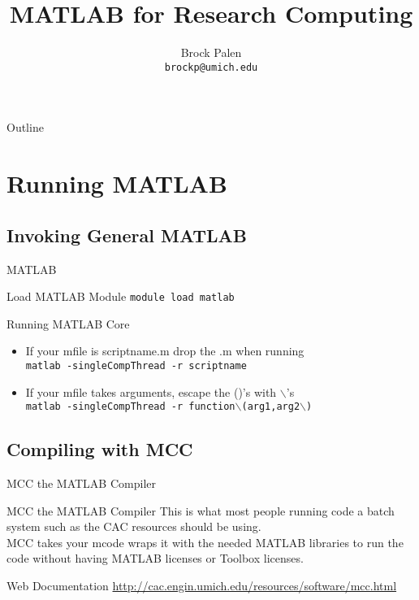 \documentclass[handout]{beamer}
\title[MATLAB for Research Computing] {MATLAB for Research Computing}
\author{Brock Palen\\ \texttt{brockp@umich.edu}}
\begin{document}
  \begin{frame}
    \titlepage
  \end{frame}

  \begin{frame}{Outline}
    \tableofcontents
  \end{frame}
  
  \section{Running MATLAB}
   \subsection{Invoking General MATLAB}
   \begin{frame}{MATLAB}
    \begin{block}{Load MATLAB Module}
         \texttt{module load matlab}
    \end{block}
    \begin{block}{Running MATLAB Core}
     \begin{itemize}
      \item If your mfile is scriptname.m drop the .m when running \\
        \texttt{matlab -singleCompThread -r scriptname} 
      \item If your mfile takes arguments, escape the ()'s with $\backslash$'s \\
        \texttt{matlab -singleCompThread -r function$\backslash$(arg1,arg2$\backslash$)}
     \end{itemize}
    \end{block}
    
   \end{frame}


   \subsection{Compiling with MCC}
   \begin{frame}{MCC the MATLAB Compiler}
    \begin{block}{MCC the MATLAB Compiler}
     This is what most people running code a batch system such as the CAC resources should be using. \\
     MCC takes your mcode wraps it with the needed MATLAB libraries to run the code without having MATLAB licenses or Toolbox licenses.
    \end{block}
    \begin{block}{Web Documentation}
     \url{http://cac.engin.umich.edu/resources/software/mcc.html}
    \end{block}
   \end{frame}
 
\end{document}
